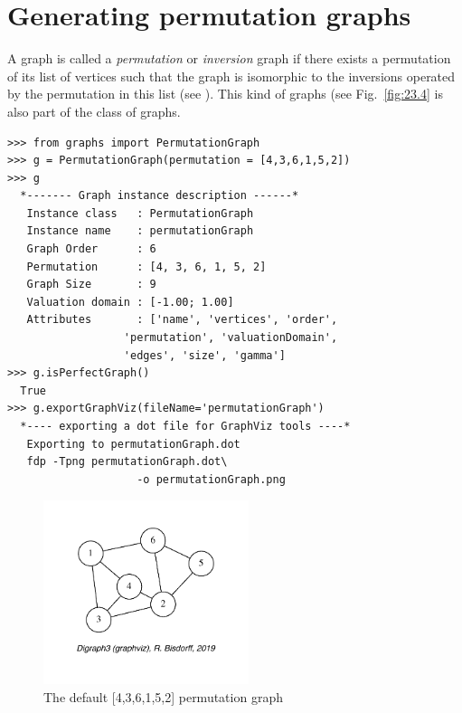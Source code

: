 \section{Generating permutation graphs}
\label{sec:23.3}

A graph is called a \emph{permutation} or \emph{inversion} graph if there exists a permutation of its list of vertices such that the graph is isomorphic to the inversions operated by the permutation in this list (see \citealp[Chapter 7, pp 157-170]{GOL-2004}). This kind of graphs (see Fig.~\vref{fig:23.4} is also part of the class of \Berge graphs.
\begin{lstlisting}
>>> from graphs import PermutationGraph
>>> g = PermutationGraph(permutation = [4,3,6,1,5,2])
>>> g
  *------- Graph instance description ------*
   Instance class   : PermutationGraph
   Instance name    : permutationGraph
   Graph Order      : 6
   Permutation      : [4, 3, 6, 1, 5, 2]
   Graph Size       : 9
   Valuation domain : [-1.00; 1.00]
   Attributes       : ['name', 'vertices', 'order',
                  'permutation', 'valuationDomain',
                  'edges', 'size', 'gamma']
>>> g.isPerfectGraph()
  True
>>> g.exportGraphViz(fileName='permutationGraph')
  *---- exporting a dot file for GraphViz tools ----*
   Exporting to permutationGraph.dot
   fdp -Tpng permutationGraph.dot\
                    -o permutationGraph.png
\end{lstlisting}
\begin{figure}[ht]
\sidecaption[t]
\includegraphics[width=6cm]{Figures/23-4-permutationGraph.pdf}
\caption{The default [4,3,6,1,5,2] permutation graph} 
\label{fig:23.4}       %
\end{figure}

